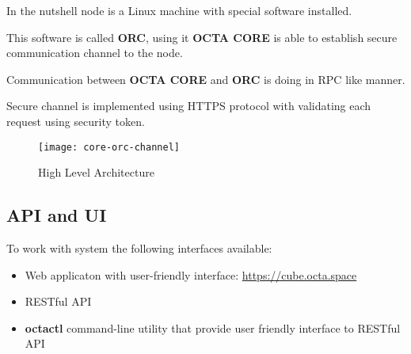 In the nutshell node is a Linux machine with special software installed.

This software is called \textbf{ORC}, using it \textbf{OCTA CORE} is able to establish secure communication channel to the node.

Communication between \textbf{OCTA CORE} and \textbf{ORC} is doing in RPC\cite{rpc} like manner.

Secure channel is implemented using HTTPS\cite{https} protocol with validating each request using security token.

\begin{figure}[H]
    \centering
    \texttt{[image: core-orc-channel]}
    \caption{High Level Architecture}
\end{figure}

\subsection{API and UI}

To work with system the following interfaces available:

\begin{itemize}
    \item Web applicaton with user-friendly interface: \url{https://cube.octa.space}
    \item RESTful API
    \item \textbf{octactl} command-line utility that provide user friendly interface to RESTful API
\end{itemize}
